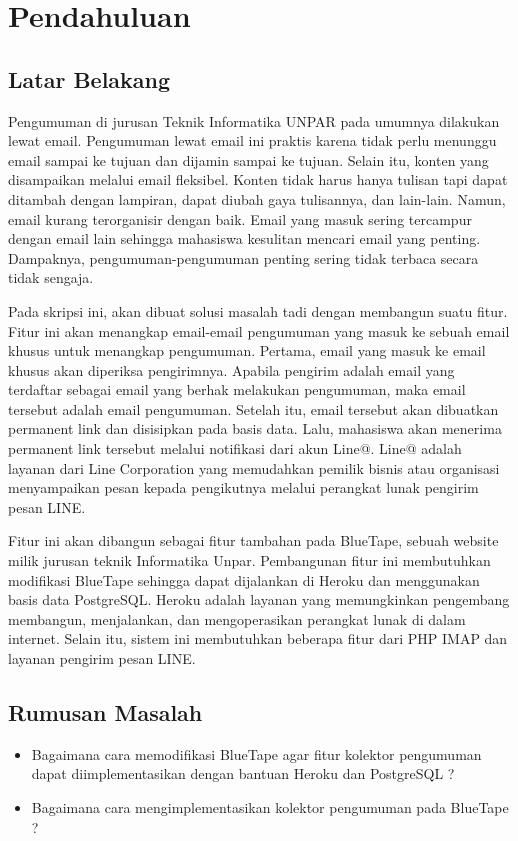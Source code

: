 \chapter{Pendahuluan}
\label{chap:pendahuluan}
   
\section{Latar Belakang}
\label{sec:latarBelakang}
Pengumuman di jurusan Teknik Informatika UNPAR pada umumnya dilakukan lewat email. Pengumuman lewat email ini praktis karena tidak perlu menunggu email sampai ke tujuan dan dijamin sampai ke tujuan. Selain itu, konten yang disampaikan melalui email fleksibel. Konten tidak harus hanya tulisan tapi dapat ditambah dengan lampiran, dapat diubah gaya tulisannya, dan lain-lain. Namun, email kurang terorganisir dengan baik. Email yang masuk sering tercampur dengan email lain sehingga mahasiswa kesulitan mencari email yang penting. Dampaknya, pengumuman-pengumuman penting sering tidak terbaca secara tidak sengaja.

Pada skripsi ini, akan dibuat solusi masalah tadi dengan membangun suatu fitur. Fitur ini akan menangkap email-email pengumuman yang masuk ke sebuah email khusus untuk menangkap pengumuman. Pertama, email yang masuk ke email khusus akan diperiksa pengirimnya. Apabila pengirim adalah email yang terdaftar sebagai email yang berhak melakukan pengumuman, maka email tersebut adalah email pengumuman. Setelah itu, email tersebut akan dibuatkan permanent link dan disisipkan pada basis data. Lalu, mahasiswa akan menerima permanent link tersebut melalui notifikasi dari akun Line@. Line@ adalah layanan dari Line Corporation yang memudahkan pemilik bisnis atau organisasi menyampaikan pesan kepada pengikutnya melalui perangkat lunak pengirim pesan LINE.

Fitur ini akan dibangun sebagai fitur tambahan pada BlueTape, sebuah website milik jurusan teknik Informatika Unpar. Pembangunan fitur ini membutuhkan modifikasi BlueTape sehingga dapat dijalankan di Heroku dan menggunakan basis data PostgreSQL. Heroku adalah layanan yang memungkinkan pengembang membangun, menjalankan, dan mengoperasikan perangkat lunak di dalam internet. Selain itu, sistem ini membutuhkan beberapa fitur dari PHP IMAP dan layanan pengirim pesan LINE.

\section{Rumusan Masalah}
\label{sec:rumusanmasalah}
\begin{itemize}
\item Bagaimana cara memodifikasi BlueTape agar fitur kolektor pengumuman dapat diimplementasikan dengan bantuan Heroku dan PostgreSQL ?
\item Bagaimana cara mengimplementasikan kolektor pengumuman pada BlueTape ?
\end{itemize}

